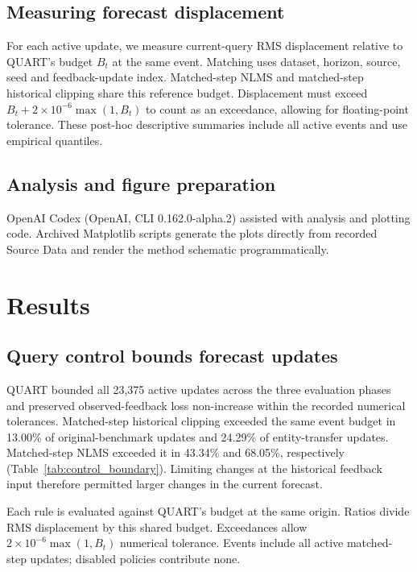 \documentclass[preprint,12pt,times,nonatbib]{elsarticle}
\begin{document}
\subsection{Measuring forecast displacement}
For each active update, we measure current-query RMS displacement relative to QUART's budget $B_t$ at the same event. Matching uses dataset, horizon, source, seed and feedback-update index. Matched-step NLMS and matched-step historical clipping share this reference budget. Displacement must exceed $B_t+2\times10^{-6}\max(1,B_t)$ to count as an exceedance, allowing for floating-point tolerance. These post-hoc descriptive summaries include all active events and use empirical quantiles.

\subsection{Analysis and figure preparation}\label{sec:analysis_workflow}
OpenAI Codex (OpenAI, CLI 0.162.0-alpha.2) assisted with analysis and plotting code. Archived Matplotlib scripts generate the plots directly from recorded Source Data and render the method schematic programmatically.

\section{Results}
\subsection{Query control bounds forecast updates}
QUART bounded all 23,375 active updates across the three evaluation phases and preserved observed-feedback loss non-increase within the recorded numerical tolerances. Matched-step historical clipping exceeded the same event budget in 13.00\% of original-benchmark updates and 24.29\% of entity-transfer updates. Matched-step NLMS exceeded it in 43.34\% and 68.05\%, respectively (Table~\ref{tab:control_boundary}). Limiting changes at the historical feedback input therefore permitted larger changes in the current forecast.

\begin{table}[!htbp]
\centering\small
\caption{Current-forecast displacement across evaluation cohorts.}
\label{tab:control_boundary}
\par\vspace{3pt}\begin{minipage}{\linewidth}\footnotesize
Each rule is evaluated against QUART's budget at the same origin. Ratios divide RMS displacement by this shared budget. Exceedances allow $2\times10^{-6}\max(1,B_t)$ numerical tolerance. Events include all active matched-step updates; disabled policies contribute none.
\end{minipage}
\end{table}
\end{document}
